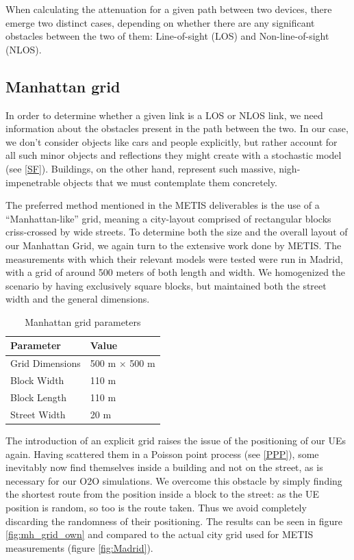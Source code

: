 When calculating the attenuation for a given path between two devices, there emerge two distinct cases, depending on whether there are any significant obstacles between the two of them: Line-of-sight (LOS) and Non-line-of-sight (NLOS).



\subsection{Manhattan grid} \label{mh_grid}
In order to determine whether a given link is a LOS or NLOS link, we need information about the obstacles present in the path between the two. In our case, we don't consider objects like cars and people explicitly, but rather account for all such minor objects and reflections they might create with a stochastic model (see \ref{SF}). Buildings, on the other hand, represent such massive, nigh-impenetrable objects that we must contemplate them concretely.

The preferred method mentioned in the METIS deliverables is the use of a ``Manhattan-like'' grid, meaning a city-layout comprised of rectangular blocks criss-crossed by wide streets. To determine both the size and the overall layout of our Manhattan Grid, we again turn to the extensive work done by METIS. The measurements with which their relevant models were tested were run in Madrid, with a grid of around 500 meters of both length and width. We homogenized the scenario by having exclusively square blocks, but maintained both the street width and the general dimensions.


\begin{table}[htbp]
\begin{center}
 \begin{tabular}{||p{3cm}|p{3cm}||} 
 \hline
 \textbf{Parameter} & \textbf{Value}\\
 \hline\hline
 Grid Dimensions & 500 m $\times$ 500 m \\ 
 \hline
 Block Width & 110 m \\
 \hline
 Block Length & 110 m \\
 \hline
 Street Width & 20 m \\
 \hline
\end{tabular}
\end{center}
\caption{Manhattan grid parameters}
\end{table}

The introduction of an explicit grid raises the issue of the positioning of our UEs again. Having scattered them in a Poisson point process (see \ref{PPP}), some inevitably now find themselves inside a building and not on the street, as is necessary for our O2O simulations. We overcome this obstacle by simply finding the shortest route from the position inside a block to the street: as the UE position is random, so too is the route taken. Thus we avoid completely discarding the randomness of their positioning. The results can be seen in figure \ref{fig:mh_grid_own} and compared to the actual city grid used for METIS measurements (figure \ref{fig:Madrid}).

